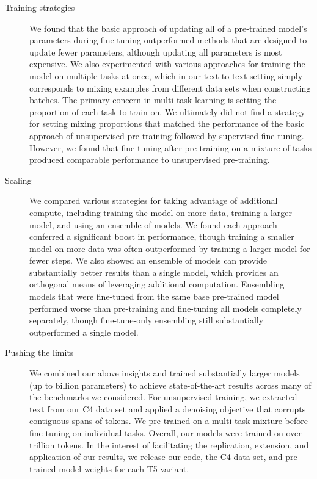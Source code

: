 \documentclass[twoside,11pt]{article}
\makeatletter
\newcommand\footnoteref[1]{\protected@xdef\@thefnmark{\ref{#1}}\@footnotemark}
\makeatother
\begin{document}
\begin{description}
\item[Training strategies] We found that the basic approach of updating all of a pre-trained model's parameters during fine-tuning outperformed methods that are designed to update fewer parameters, although updating all parameters is most expensive.
We also experimented with various approaches for training the model on multiple tasks at once, which in our text-to-text setting simply corresponds to mixing examples from different data sets when constructing batches.
The primary concern in multi-task learning is setting the proportion of each task to train on.
We ultimately did not find a strategy for setting mixing proportions that matched the performance of the basic approach of unsupervised pre-training followed by supervised fine-tuning.
However, we found that fine-tuning after pre-training on a mixture of tasks produced comparable performance to unsupervised pre-training.

\item[Scaling] We compared various strategies for taking advantage of additional compute, including training the model on more data, training a larger model, and using an ensemble of models.
We found each approach conferred a significant boost in performance, though training a smaller model on more data was often outperformed by training a larger model for fewer steps.
We also showed an ensemble of models can provide substantially better results than a single model, which provides an orthogonal means of leveraging additional computation.
Ensembling models that were fine-tuned from the same base pre-trained model performed worse than pre-training and fine-tuning all models completely separately, though fine-tune-only ensembling still substantially outperformed a single model.

\item[Pushing the limits] We combined our above insights and trained substantially larger models (up to  billion parameters) to achieve state-of-the-art results across many of the benchmarks we considered.
For unsupervised training, we extracted text from our C4 data set and applied a denoising objective that corrupts contiguous spans of tokens.
We pre-trained on a multi-task mixture before fine-tuning on individual tasks.
Overall, our models were trained on over  trillion tokens.
In the interest of facilitating the replication, extension, and application of our results, we release our code, the C4 data set, and pre-trained model weights for each T5 variant.\footnoteref{fn:oss}

\end{description}
\end{document}
